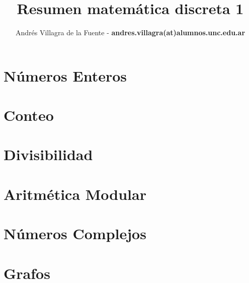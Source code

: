 \documentclass[9pt,a4paper]{article}
\title{Resumen matemática discreta 1}
\author{Andrés Villagra de la Fuente - {\bfseries  andres.villagra(at)alumnos.unc.edu.ar}}
\begin{document}
\maketitle

\part{Números Enteros}

\part{Conteo}

\part{Divisibilidad}

\part{Aritmética Modular}

\part{Números Complejos}

\part{Grafos}
\end{document}

